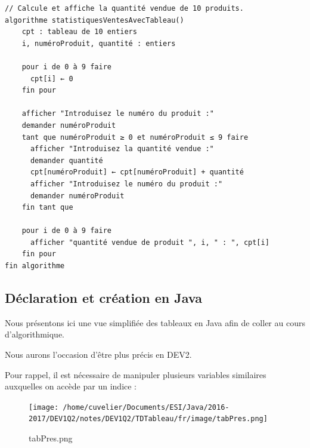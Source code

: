 \documentclass[11pt,a4paper]{article}
\begin{document}
            \par
        \begin{verbatim}
// Calcule et affiche la quantité vendue de 10 produits.
algorithme statistiquesVentesAvecTableau()
    cpt : tableau de 10 entiers
    i, numéroProduit, quantité : entiers
    
    pour i de 0 à 9 faire
      cpt[i] ← 0
    fin pour
    
    afficher "Introduisez le numéro du produit :"
    demander numéroProduit
    tant que numéroProduit ≥ 0 et numéroProduit ≤ 9 faire
      afficher "Introduisez la quantité vendue :"
      demander quantité
      cpt[numéroProduit] ← cpt[numéroProduit] + quantité
      afficher "Introduisez le numéro du produit :"
      demander numéroProduit
    fin tant que
    
    pour i de 0 à 9 faire
      afficher "quantité vendue de produit ", i, " : ", cpt[i]
    fin pour
fin algorithme
      \end{verbatim}\subsection{D\'eclaration et cr\'eation en Java}
		    Nous pr\'esentons ici une vue simplifi\'ee  des tableaux en Java afin de coller
        au cours d'algorithmique.
      
            \par
        
        Nous aurons l'occasion d'\^etre plus pr\'ecis en DEV2.
      
            \par
        
        Pour rappel, il est n\'ecessaire de manipuler plusieurs variables similaires
        auxquelles on acc\`ede par un indice :
      
            \par
        \begin{figure}[hbt]
				    \begin{center}
					\texttt{[image: /home/cuvelier/Documents/ESI/Java/2016-2017/DEV1Q2/notes/DEV1Q2/TDTableau/fr/image/tabPres.png]}
						\end{center}
                
                    \caption[tabPres.png]{tabPres.png}
                \end{figure}
                    
            \par
        
\end{document}
